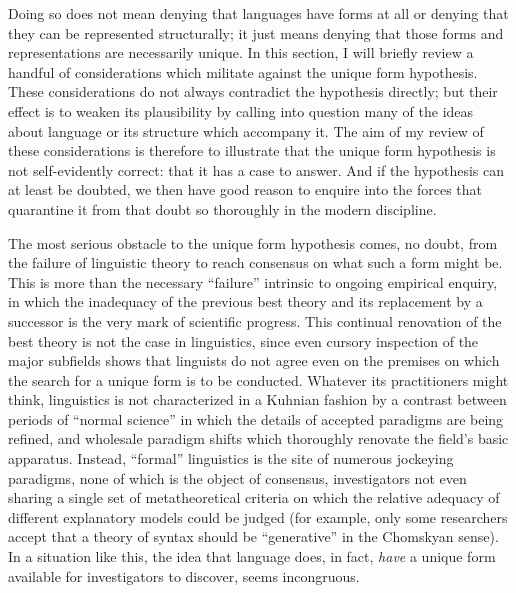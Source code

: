 \documentclass[output=paper]{langscibook}
\begin{document}
Doing so does not mean denying that languages have forms at all or denying that they can be represented structurally; it just means denying that those forms and representations are necessarily unique. In this section, I will briefly review a handful of considerations which militate against the unique form hypothesis. These considerations do not always contradict the hypothesis directly; but their effect is to weaken its plausibility by calling into question many of the ideas about language or its structure which accompany it. The aim of my review of these considerations is therefore to illustrate that the unique form hypothesis is not self-evidently correct: that it has a case to answer. And if the hypothesis can at least be doubted, we then have good reason to enquire into the forces that quarantine it from that doubt so thoroughly in the modern discipline.

The most serious obstacle to the unique form hypothesis comes, no doubt, from the failure of linguistic theory to reach consensus on what such a form might be. This is more than the necessary ``failure'' intrinsic to ongoing empirical enquiry, in which the inadequacy of the previous best theory and its replacement by a successor is the very mark of scientific progress. This continual renovation of the best theory is not the case in linguistics, since even cursory inspection of the major subfields shows that linguists do not agree even on the premises on which the search for a unique form is to be conducted. Whatever its practitioners might think, linguistics is not characterized in a Kuhnian fashion by a contrast between periods of ``normal science'' in which the details of accepted paradigms are being refined, and wholesale paradigm shifts which thoroughly renovate the field’s basic apparatus. Instead, ``formal'' linguistics is the site of numerous jockeying paradigms, none of which is the object of consensus, investigators not even sharing a single set of metatheoretical criteria on which the relative adequacy of different explanatory models could be judged (for example, only some researchers accept that a theory of syntax should be ``generative'' in the Chomskyan sense). In a situation like this, the idea that language does, in fact, \emph{have} a unique form available for investigators to discover, seems incongruous.
\end{document}
